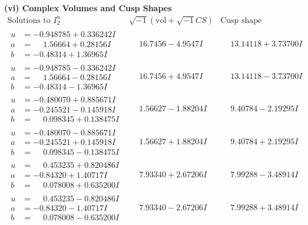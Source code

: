 \documentclass[1p]{elsarticle_modified}
\theoremstyle{definition}
\newcommand{\I}{\sqrt{-1}}
\begin{document}
\newpage\flushleft \textbf{(vi) Complex Volumes and Cusp Shapes}
$$\begin{array}{c|c|c}  
\text{Solutions to }I^u_{2}& \I (\text{vol} + \sqrt{-1}CS) & \text{Cusp shape}\\
 \hline 
\begin{aligned}
u &= -0.948785 + 0.336242 I \\
a &= \phantom{-}1.56664 + 0.28156 I \\
b &= -0.48314 + 1.36965 I\end{aligned}
 & \phantom{-}16.7456 - 4.9547 I & \phantom{-}13.14118 + 3.73700 I \\ \hline\begin{aligned}
u &= -0.948785 - 0.336242 I \\
a &= \phantom{-}1.56664 - 0.28156 I \\
b &= -0.48314 - 1.36965 I\end{aligned}
 & \phantom{-}16.7456 + 4.9547 I & \phantom{-}13.14118 - 3.73700 I \\ \hline\begin{aligned}
u &= -0.480070 + 0.885671 I \\
a &= -0.245521 - 0.145918 I \\
b &= \phantom{-}0.098345 + 0.138475 I\end{aligned}
 & \phantom{-}1.56627 - 1.88204 I & \phantom{-}9.40784 - 2.19295 I \\ \hline\begin{aligned}
u &= -0.480070 - 0.885671 I \\
a &= -0.245521 + 0.145918 I \\
b &= \phantom{-}0.098345 - 0.138475 I\end{aligned}
 & \phantom{-}1.56627 + 1.88204 I & \phantom{-}9.40784 + 2.19295 I \\ \hline\begin{aligned}
u &= \phantom{-}0.453235 + 0.820486 I \\
a &= -0.84320 + 1.40717 I \\
b &= \phantom{-}0.078008 + 0.635200 I\end{aligned}
 & \phantom{-}7.93340 + 2.67206 I & \phantom{-}7.99288 - 3.48914 I \\ \hline\begin{aligned}
u &= \phantom{-}0.453235 - 0.820486 I \\
a &= -0.84320 - 1.40717 I \\
b &= \phantom{-}0.078008 - 0.635200 I\end{aligned}
 & \phantom{-}7.93340 - 2.67206 I & \phantom{-}7.99288 + 3.48914 I \\ \hline\begin{aligned}

\end{aligned}
\end{array}$$
\end{document}
